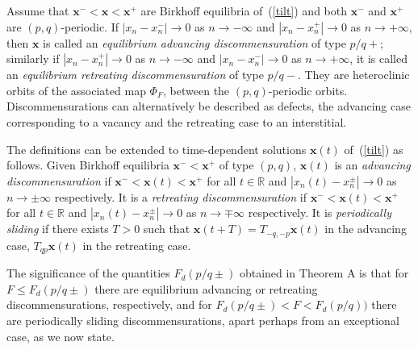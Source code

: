 \documentclass[12pt]{article}
\newcommand{\R}{\mathbb{R}}
\newcounter{number}
\newtheorem{corollary}{Corollary}
\newcommand{\begco}{\begin{corollary}\hspace{1em}}
\newcommand{\eco}{\end{corollary}
   \addtocounter{number}{1}}
\newcommand{\refer}[1]{~(\ref{#1})}
\newcommand{\xbf}{{\mathbf{x}}}
\newcommand{\WQ}{\textcolor{blue}}
\begin{document}



Assume that $\xbf^-<\xbf<\xbf^+$ are Birkhoff equilibria of\refer{tilt} and both $\xbf^-$ and $\xbf^+$ are $(p,q)$-periodic. If
$|x_n-x^-_n| \to 0$ as $n \to -\infty$ and $|x_n-x^+_n| \to 0$ as $n \to +\infty$, then $\xbf$ is called an {\em equilibrium advancing discommensuration} of type $p/q+$; similarly if $|x_n-x^+_n| \to 0$ as $n \to -\infty$ and $|x_n-x^-_n| \to 0$ as $n \to +\infty$, it is called an {\em equilibrium retreating discommensuration} of type $p/q-$.
They are heteroclinic orbits of the associated map $\Phi_F$, between the $(p,q)$-periodic orbits.  Discommensurations can alternatively be described as defects, the advancing case corresponding to a vacancy and the retreating case to an interstitial.

The definitions can be extended to time-dependent solutions $\xbf(t)$ of\refer{tilt} as follows.  Given Birkhoff equilibria $\xbf^- < \xbf^+$ of type $(p,q)$, $\xbf(t)$ is an {\em advancing discommensuration} if $\xbf^- < \xbf(t) < \xbf^+$ for all $t\in \R$ and $|x_n(t)-x_n^\pm|\to 0$ as $n\to \pm \infty$ respectively.  It is a {\em retreating discommensuration} if $\xbf^- < \xbf(t) < \xbf^+$ for all $t\in \R$ and $|x_n(t)-x_n^\pm|\to 0$ as $n\to \mp \infty$ respectively.  It is {\em periodically sliding} if there exists $T>0$ such that $\xbf(t+T) = T_{-q,-p}\xbf(t)$ in the advancing case, $T_{qp}\xbf(t)$ in the retreating case.

The significance of the quantities $F_d(p/q\pm)$ obtained in Theorem A is that 
for $F\le F_d(p/q\pm)$ there are equilibrium advancing or retreating discommensurations, respectively,  and  for 
$F_d(p/q\pm)<F<F_d(p/q))$ there are periodically sliding discommensurations,
apart perhaps from an exceptional case, as we now state.
\end{document}
